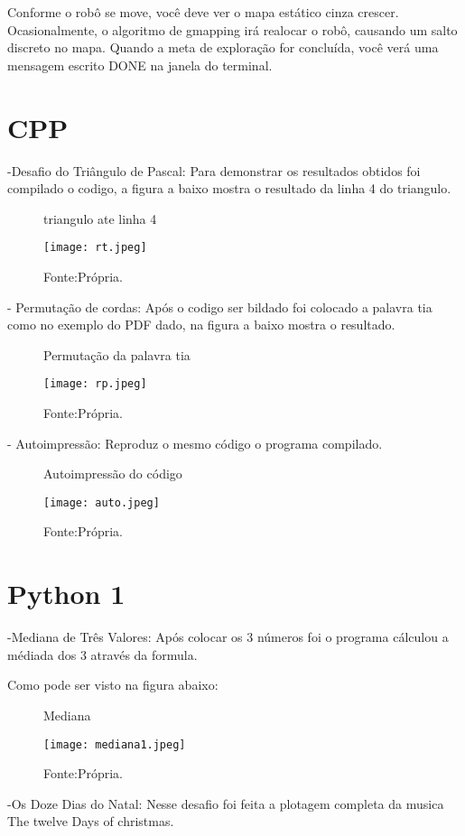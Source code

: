 Conforme o robô se move, você deve ver o mapa estático cinza crescer. Ocasionalmente, o algoritmo de gmapping irá realocar o robô, causando um salto discreto no mapa. Quando a meta de exploração for concluída, você verá uma mensagem escrito DONE na janela do terminal.
\section{CPP}
-Desafio do Triângulo de Pascal:
Para demonstrar os resultados obtidos foi compilado o codigo, a figura a baixo mostra o resultado da linha 4 do triangulo.
\begin{figure} [h!]	
    \centering
    \caption{triangulo ate linha 4}
    \texttt{[image: rt.jpeg]}
    \caption*{Fonte:Própria.}
    \label{fig:triangulodepascal}
\end{figure}

- Permutação de cordas:
Após o codigo ser bildado foi colocado a palavra tia como no exemplo do PDF dado, na figura a baixo mostra o resultado.
\begin{figure} [h!]	
    \centering
    \caption{Permutação da palavra tia}
    \texttt{[image: rp.jpeg]}
    \caption*{Fonte:Própria.}
    \label{fig:permutacao}
\end{figure}

- Autoimpressão: Reproduz o mesmo código o programa compilado.

\begin{figure} [h!]	
    \centering
    \caption{Autoimpressão do código}
    \texttt{[image: auto.jpeg]}
    \caption*{Fonte:Própria.}
    \label{fig:Autoimpressão}
\end{figure}

\section{Python 1}
-Mediana de Três Valores:
Após colocar os 3 números foi o programa cálculou a médiada dos 3 através da formula.

Como pode ser visto na figura abaixo:
\begin{figure} [h!]	
    \centering
    \caption{Mediana}
    \texttt{[image: mediana1.jpeg]}
    \caption*{Fonte:Própria.}
    \label{fig:med}
\end{figure}

-Os Doze Dias do Natal:
Nesse desafio foi feita a plotagem completa da musica The twelve Days of christmas.

